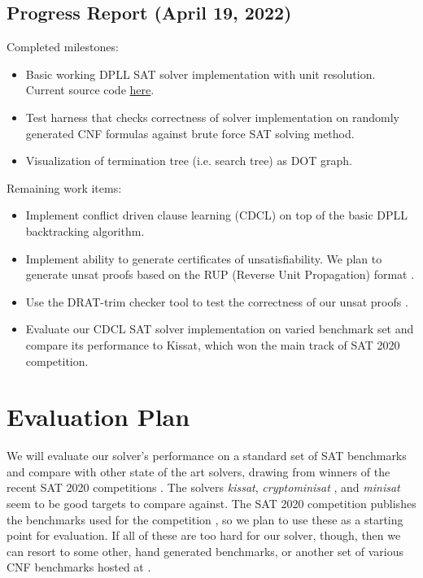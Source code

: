 \documentclass[12pt]{article}
\begin{document}
\subsection*{Progress Report (April 19, 2022)}

Completed milestones:

\begin{itemize}
    \item Basic working DPLL SAT solver implementation with unit resolution. Current source code \href{https://github.com/will62794/mysat}{here}.
    \item Test harness that checks correctness of solver implementation on randomly generated CNF formulas against brute force SAT solving method.
    \item Visualization of termination tree (i.e. search tree) as DOT graph.
\end{itemize}
Remaining work items:
\begin{itemize}
    \item Implement conflict driven clause learning (CDCL) on top of the basic DPLL backtracking algorithm.
    \item Implement ability to generate certificates of unsatisfiability. We plan to generate unsat proofs based on the RUP (Reverse Unit Propagation) format \cite{goldberg03,heule13}.
    \item Use the DRAT-trim checker tool to test the correctness of our unsat proofs \cite{drattrimtool}.
    \item Evaluate our CDCL SAT solver implementation on varied benchmark set and compare its performance to Kissat\cite{2020kissat}, which won the main track of SAT 2020 competition.
\end{itemize}


\section{Evaluation Plan}
We will evaluate our solver's performance on a standard set of SAT benchmarks and compare with other state of the art solvers, drawing from winners of the recent SAT 2020 competitions \cite{2020satresults}. The solvers \textit{kissat}\cite{2020kissat}, \textit{cryptominisat} \cite{09cryptominisat}, and \textit{minisat}\cite{minisat} seem to be good targets to compare against. The SAT 2020 competition publishes the benchmarks used for the competition \cite{sat2020benchmarks}, so we plan to use these as a starting point for evaluation. If all of these are too hard for our solver, though, then we can resort to some other, hand generated benchmarks, or another set of various CNF benchmarks hosted at \cite{dimacsCNF}.



\end{document}

